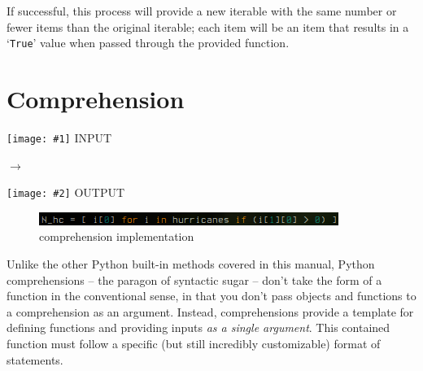 \documentclass[12pt]{article}
\newcommand{\bna}[2]{
        \begin{minipage}[c]{.4\textwidth}
		\begin{center}
		\texttt{[image: \#1]}
		\textsc{INPUT}
		\end{center}
        \end{minipage}
	\begin{minipage}[c]{.1\textwidth}
		\center\LARGE$\longrightarrow$
	\end{minipage}
        \begin{minipage}[c]{.4\textwidth}
		\begin{center}
		\texttt{[image: \#2]}
		\textsc{OUTPUT}
		\end{center}
        \end{minipage}\vspace{.12in}
        }
\begin{document}
\noindent
If successful, this process will provide a new iterable with the same number or fewer items than the original iterable; each item will be an item that results in a `\texttt{True}' value when passed through the provided function.

\newpage
\section{Comprehension}
\label{comprehension}


\begin{center}
\bna{./figures/6_comprehension/in_comprehension.png}{./figures/6_comprehension/out_comprehension.png}
\end{center}

\begin{figure}
	\begin{center}
		\includegraphics[width=.58\textwidth]{./figures/6_comprehension/codeblock_comprehension.png}
		\caption{comprehension implementation}
		\label{comprehension code} %
	\end{center}
\end{figure}

Unlike the other Python built-in methods covered in this manual, Python comprehensions -- the paragon of syntactic sugar -- don't take the form of a function in the conventional sense, in that you don't pass objects and functions to a comprehension as an argument. Instead, comprehensions provide a template for defining functions and providing inputs \textit{as a single argument}. This contained function must follow a specific (but still incredibly customizable) format of statements.
\end{document}
